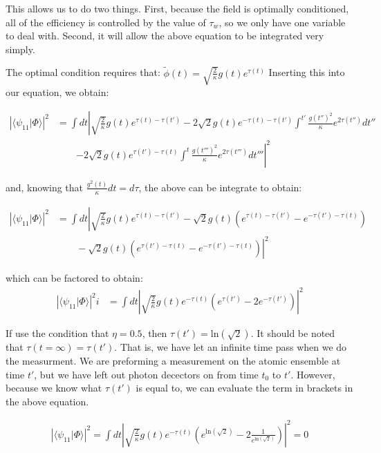\documentclass[12pt]{article}
\begin{document}
This allows us to do two things. First, because the field is optimally conditioned, all of the efficiency is controlled by the value of $\tau_w$, so we only have one variable to deal with. Second, it will allow the above equation to be integrated very simply.

The optimal condition requires that: $\tilde{\phi}(t) = \sqrt{\frac{2}{\kappa}} g(t) e^{\tau(t)}$
Inserting this into our equation, we obtain:

\begin{align}
\left | \langle \psi_{11} | \Phi \rangle \right | ^2 &= \int dt \left | \sqrt{\frac{2}{\kappa}} g(t) e^{\tau(t)-\tau(t')} \right.
      -2\sqrt{2}g(t) e^{-\tau(t)-\tau(t')} \int^{t'} \frac{g(t'')^2}{\kappa} e^{2\tau(t'')} dt'' \\
       &\qquad \left.-2\sqrt{2} g(t) e^{\tau(t')-\tau(t)} \int^t \frac{g(t''')^2}{\kappa} e^{2\tau(t''')} dt'''\right |^2
\end{align}

and, knowing that $\frac{g^2(t)}{\kappa}dt = d\tau$, the above can be integrate to obtain:

\begin{align}
\left | \langle \psi_{11} | \Phi \rangle \right | ^2 &=\int dt \left| \sqrt{\frac{2}{\kappa}} g(t) e^{\tau(t)-\tau(t')} - \sqrt{2} g(t)\left( e^{\tau(t)-\tau(t')} - e^{-\tau(t')-\tau(t)} \right )\right.\\
&\left. \qquad -\sqrt{2} g(t) \left( e^{\tau(t')-\tau(t)} - e^{-\tau(t')-\tau(t)} \right)\right|^2 
\end{align}

which can be factored to obtain:
\begin{align}
\left | \langle \psi_{11} | \Phi \rangle \right | ^2 i &= \int dt \left|\sqrt{\frac{2}{\kappa}} g(t) e^{-\tau(t)} \left ( e^{\tau(t')} -2 e^{-\tau(t')} \right ) \right |^2 
\end{align}

If use the condition that $\eta=0.5$, then $\tau(t') = \textrm{ln}(\sqrt{2})$. It should be noted that $\tau(t=\infty) = \tau(t')$. That is, we have let an infinite time pass when we do the measurment. We are preforming a measurement on the atomic ensemble at time $t'$, but we have left out photon decectors on from time $t_0$ to $t'$. However, because we know what $\tau(t')$ is equal to, we can evaluate the term in brackets in the above equation.

\begin{align}
\left | \langle \psi_{11} | \Phi \rangle \right | ^2 = \int dt \left| \sqrt{\frac{2}{\kappa}} g(t) e^{-\tau(t)} \left ( e^{\textrm{ln}(\sqrt{2})} -2 \frac{1}{e^{\textrm{ln}({\sqrt{2}})}} \right ) \right|^2 = 0 
\end{align}
\end{document}
